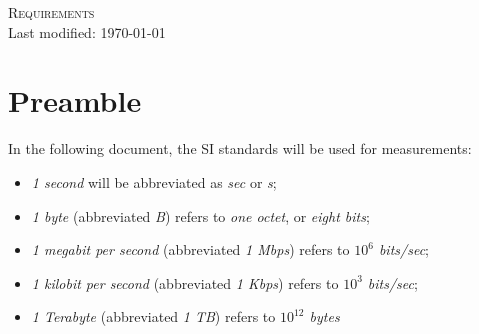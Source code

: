 \documentclass[10pt,a4paper]{report}
\begin{document}
    \begin{center}
        {\LARGE \textsc{Requirements}}\\
        Last modified: \today
    \end{center}
    \section*{Preamble}
        In the following document, the SI standards will be used for measurements:
        \begin{itemize}
            \item \emph{1 second} will be abbreviated as \emph{sec} or \emph{s};
            
            \item \emph{1 byte} (abbreviated \emph{B}) refers to \emph{one octet}, or \emph{eight bits};
            
            \item \emph{1 megabit per second} (abbreviated \emph{1 Mbps}) refers to \emph{$10^6$ bits/sec};
            
            \item \emph{1 kilobit per second} (abbreviated \emph{1 Kbps}) refers to \emph{$10^3$ bits/sec};
            
            \item \emph{1 Terabyte} (abbreviated \emph{1 TB}) refers to \emph{$10^{12}$ bytes}
        \end{itemize}
\end{document}
